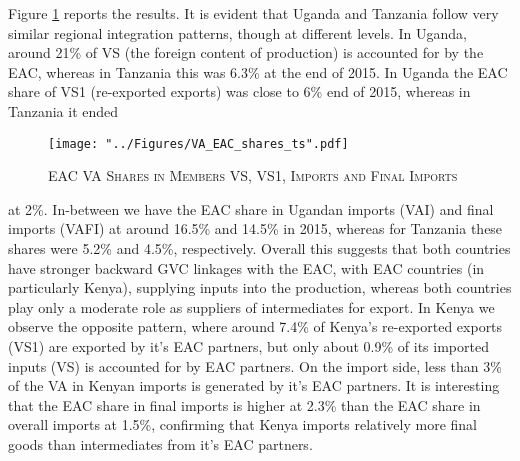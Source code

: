 \documentclass[a4paper]{article}
\begin{document}
%
%
%
%
%
Figure \ref{fig:VAEACshares} reports the results. It is evident that Uganda and Tanzania follow very similar regional integration patterns, though at different levels. In Uganda, around 21\% of VS (the foreign content of production) is accounted for by the EAC, whereas in Tanzania this was 6.3\% at the end of 2015. In Uganda the EAC share of VS1 (re-exported exports) was close to 6\% end of 2015, whereas in Tanzania it ended 

\begin{figure}[h!]
\centering
\caption{\label{fig:VAEACshares}\textsc{EAC VA Shares in Members VS, VS1, Imports and Final Imports}}
\texttt{[image: "../Figures/VA\_EAC\_shares\_ts".pdf]} %
\end{figure}
\FloatBarrier

\noindent at 2\%. In-between we have the EAC share in Ugandan imports (VAI) and final imports (VAFI) at around 16.5\% and 14.5\% in 2015, whereas for Tanzania these shares were 5.2\% and 4.5\%, respectively. Overall this suggests that both countries have stronger backward GVC linkages with the EAC, with EAC countries (in particularly Kenya), supplying inputs into the production, whereas both countries play only a moderate role as suppliers of intermediates for export. In Kenya we observe the opposite pattern, where around 7.4\% of Kenya's re-exported exports (VS1) are exported by it's EAC partners, but only about 0.9\% of its imported inputs (VS) is accounted for by EAC partners. On the import side, less than 3\% of the VA in Kenyan imports is generated by it's EAC partners. It is interesting that the EAC share in final imports is higher at 2.3\% than the EAC share in overall imports at 1.5\%, confirming that Kenya imports relatively more final goods than intermediates from it's EAC partners. \newline
\end{document}
